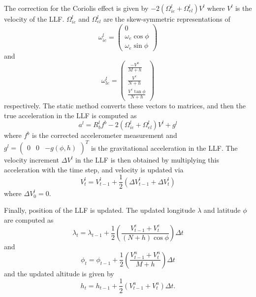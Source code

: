\documentclass[11pt, oneside]{article}   	%
\begin{document}
The correction for the Coriolis effect is given by $-2(\Omega_{ie}^l+\Omega_{el}^l)V^l$ where $V^l$ is the velocity of the LLF.  $\Omega_{ie}^l$ and $\Omega_{el}^l$ are the skew-symmetric representations of 
\begin{equation}
\omega_{ie}^l=\begin{pmatrix}
0 \\
\omega_e\cos\phi \\
\omega_e\sin\phi
\end{pmatrix}
\end{equation}
and
\begin{equation}
\omega_{le}^l=\begin{pmatrix}
\frac{-V^n}{M+h} \\[.1cm]
\frac{V^e}{N+h} \\[.1cm]
\frac{V^e\tan\phi}{N+h}
\end{pmatrix}
\end{equation}
respectively.  The static method  converts these vectors to matrices, and then the true acceleration in the LLF is computed as
\begin{equation}
a^l=R_b^lf^b-2(\Omega_{ie}^l+\Omega_{el}^l)V^l+g^l
\end{equation}
where $f^b$ is the corrected accelerometer measurement and $g^l=\begin{pmatrix}0&0&-g(\phi, h)\end{pmatrix}^T$ is the gravitational acceleration in the LLF.  The velocity increment $\Delta V^l$ in the LLF is then obtained by multiplying this acceleration with the time step, and velocity is updated via
\begin{equation}
V^l_t=V^l_{t-1}+\frac12\left(\Delta V^l_{t-1}+\Delta V^l_t\right)
\end{equation}
where $\Delta V^l_0=0$.

Finally, position of the LLF is updated.  The updated longitude $\lambda$ and latitude $\phi$ are computed as
\begin{equation}
\lambda_t=\lambda_{t-1}+\frac12\left(\frac{V^e_{t-1}+V^e_t}{(N+h)\cos\phi}\right)\Delta t
\end{equation}
and
\begin{equation}
\phi_t=\phi_{t-1}+\frac12\left(\frac{V^n_{t-1}+V^n_t}{M+h}\right)\Delta t
\end{equation}
and the updated altitude is given by
\begin{equation}
h_t=h_{t-1}+\frac12\left(V^u_{t-1}+V^u_t\right)\Delta t.
\end{equation}
\end{document}

